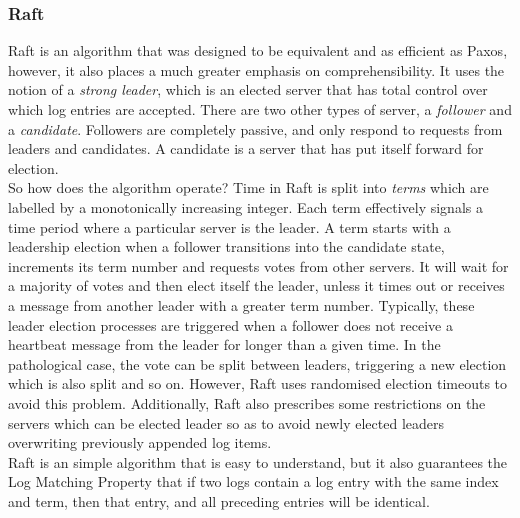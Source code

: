 \documentclass[12pt,a4paper,twoside,openright]{report}
\begin{document}
	\subsubsection*{Raft}
	Raft \cite{Raft} is an algorithm that was designed to be equivalent and as efficient as Paxos, however, it also places a much greater emphasis on comprehensibility.
	It uses the notion of a \textit{strong leader}, which is an elected server that has total control over which log entries are accepted.
	There are two other types of server, a \textit{follower} and a \textit{candidate}. 
	Followers are completely passive, and only respond to requests from leaders and candidates. 
	A candidate is a server that has put itself forward for election.\\

	So how does the algorithm operate? 
	Time in Raft is split into \textit{terms} which are labelled by a monotonically increasing integer. 
	Each term effectively signals a time period where a particular server is the leader. 
	A term starts with a leadership election when a follower transitions into the candidate state, increments its term number and requests votes from other servers. 
	It will wait for a majority of votes and then elect itself the leader, unless it times out or receives a message from another leader with a greater term number. 
	Typically, these leader election processes are triggered when a follower does not receive a heartbeat message from the leader for longer than a given time.
	In the pathological case, the vote can be split between leaders, triggering a new election which is also split and so on.
	However, Raft uses randomised election timeouts to avoid this problem.
	Additionally, Raft also prescribes some restrictions on the servers which can be elected leader so as to avoid newly elected leaders overwriting previously appended log items.\\
	
	Raft is an simple algorithm that is easy to understand, but it also guarantees the Log Matching Property that if two logs contain a log entry with the same index and term, then that entry, and all preceding entries will be identical.
\end{document}
